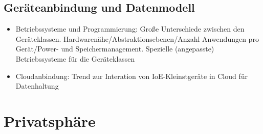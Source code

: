 \subsection{Geräteanbindung und Datenmodell}
\begin{itemize}
	\item Betriebssysteme und Programmierung: Große Unterschiede zwischen den Geräteklassen. Hardwarenähe/Abstraktionsebenen/Anzahl Anwendungen pro Gerät/Power- und Speichermanagement. Spezielle (angepasste) Betriebssysteme für die Geräteklassen
	\item Cloudanbindung: Trend zur Interation von IoE-Kleinstgeräte in Cloud für Datenhaltung
\end{itemize}



\section{Privatsphäre}

